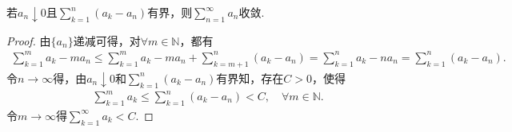 \documentclass[../../main.tex]{subfiles}%
\begin{document}
\begin{proposition}
若$a_n \downarrow 0$且$\sum_{k=1}^n \left( a_k - a_n \right)$有界，则$\sum_{n=1}^{\infty} a_n$收敛.
\end{proposition}
\begin{proof}
由$\{a_n\}$递减可得，对$\forall m \in \mathbb{N}$，都有
\begin{align*}
\sum_{k=1}^m a_k - m a_n \leqslant \sum_{k=1}^m a_k - m a_n + \sum_{k=m+1}^n \left( a_k - a_n \right) = \sum_{k=1}^n a_k - n a_n = \sum_{k=1}^n \left( a_k - a_n \right).
\end{align*}
令$n \rightarrow \infty$得，由$a_n \downarrow 0$和$\sum_{k=1}^n \left( a_k - a_n \right)$有界知，存在$C > 0$，使得
\begin{align*}
\sum_{k=1}^m a_k \leqslant \sum_{k=1}^n \left( a_k - a_n \right) < C, \quad \forall m \in \mathbb{N}.
\end{align*}
令$m \rightarrow \infty$得$\sum_{k=1}^{\infty} a_k < C$.
\end{proof}
\end{document}
